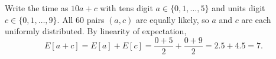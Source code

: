 Write the time as $10a+c$ with tens digit $a\in\{0,1,\dots,5\}$ and units digit $c\in\{0,1,\dots,9\}$. All $60$ pairs $(a,c)$ are equally likely, so $a$ and $c$ are each uniformly distributed. By linearity of expectation,
\[E[a+c]=E[a]+E[c]=\dfrac{0+5}{2}+\dfrac{0+9}{2}=2.5+4.5=\boxed{7}.\]
